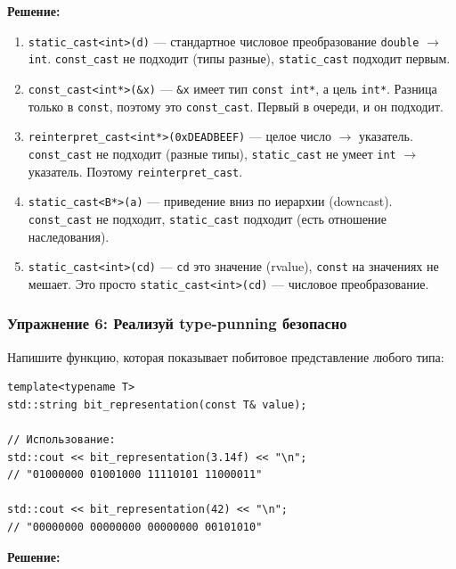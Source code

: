 \documentclass[a4paper,12pt]{article}
\begin{document}
\textbf{Решение:}

\begin{enumerate}
    \item \texttt{static\_cast<int>(d)} --- стандартное числовое преобразование
          \texttt{double} $\to$ \texttt{int}. \texttt{const\_cast} не подходит
          (типы разные), \texttt{static\_cast} подходит первым.

    \item \texttt{const\_cast<int*>(\&x)} --- \texttt{\&x} имеет тип
          \texttt{const int*}, а цель \texttt{int*}. Разница только в \texttt{const},
          поэтому это \texttt{const\_cast}. Первый в очереди, и он подходит.

    \item \texttt{reinterpret\_cast<int*>(0xDEADBEEF)} --- целое число $\to$ указатель.
          \texttt{const\_cast} не подходит (разные типы), \texttt{static\_cast}
          не умеет \texttt{int} $\to$ указатель. Поэтому \texttt{reinterpret\_cast}.

    \item \texttt{static\_cast<B*>(a)} --- приведение вниз по иерархии (downcast).
          \texttt{const\_cast} не подходит, \texttt{static\_cast} подходит
          (есть отношение наследования).

    \item \texttt{static\_cast<int>(cd)} --- \texttt{cd} это значение (rvalue),
          \texttt{const} на значениях не мешает. Это просто \texttt{static\_cast<int>(cd)} ---
          числовое преобразование.
\end{enumerate}

\subsubsection{Упражнение 6: Реализуй type-punning безопасно}

Напишите функцию, которая показывает побитовое представление любого типа:

\begin{lstlisting}
template<typename T>
std::string bit_representation(const T& value);

// Использование:
std::cout << bit_representation(3.14f) << "\n";
// "01000000 01001000 11110101 11000011"

std::cout << bit_representation(42) << "\n";
// "00000000 00000000 00000000 00101010"
\end{lstlisting}

\textbf{Решение:}
\end{document}
